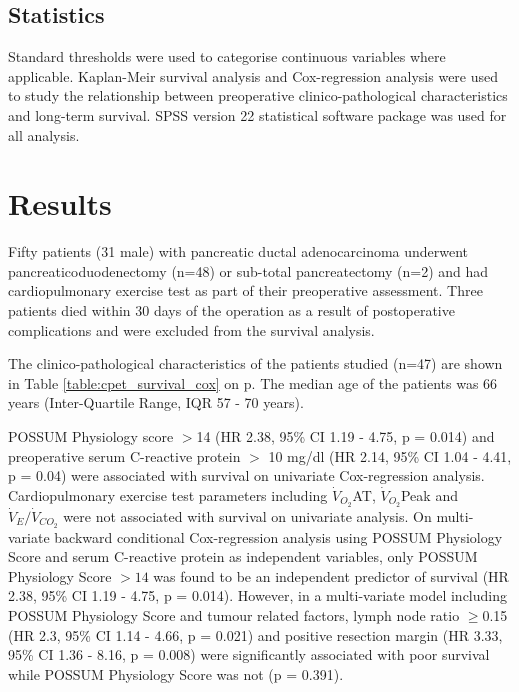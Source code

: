 \subsection{Statistics}
Standard thresholds were used to categorise continuous variables where applicable. Kaplan-Meir survival analysis and Cox-regression analysis were used to study the relationship between preoperative clinico-pathological characteristics and long-term survival. SPSS version 22 statistical software package was used for all analysis.

\clearpage

\section{Results}




Fifty patients (31 male) with pancreatic ductal adenocarcinoma underwent pancreaticoduodenectomy (n=48) or sub-total pancreatectomy (n=2) and had cardiopulmonary exercise test as part of their preoperative assessment. Three patients died within 30 days of the operation as a result of postoperative complications and were excluded from the survival analysis.

The clinico-pathological characteristics of the patients studied (n=47) are shown in Table \ref{table:cpet_survival_cox} on p\pageref{table:cpet_survival_cox}.   The median age of the patients was 66 years (Inter-Quartile Range, IQR 57 - 70 years).

POSSUM Physiology score $>$14 (HR 2.38, 95\% CI 1.19 - 4.75, p = 0.014) and preoperative serum C-reactive protein $>$ 10 mg/dl (HR 2.14, 95\% CI 1.04 - 4.41, p = 0.04) were associated with survival on univariate Cox-regression analysis. Cardiopulmonary exercise test parameters including $\dot{V}_{O_2}$AT, $\dot{V}_{O_2}$Peak and $\dot{V}_E/\dot{V}_{CO_2}$ were not associated with survival on univariate analysis.
On multi-variate backward conditional Cox-regression analysis using POSSUM Physiology Score and serum C-reactive protein as independent variables, only POSSUM Physiology Score $>14$  was found to be an independent predictor of survival (HR 2.38, 95\% CI 1.19 - 4.75, p = 0.014). However, in a multi-variate model including POSSUM Physiology Score and tumour related factors, lymph node ratio $\geq$0.15 (HR 2.3, 95\% CI 1.14 - 4.66, p = 0.021) and positive resection margin (HR 3.33, 95\% CI 1.36 - 8.16, p = 0.008) were significantly associated with poor survival while POSSUM Physiology Score was not (p = 0.391).

